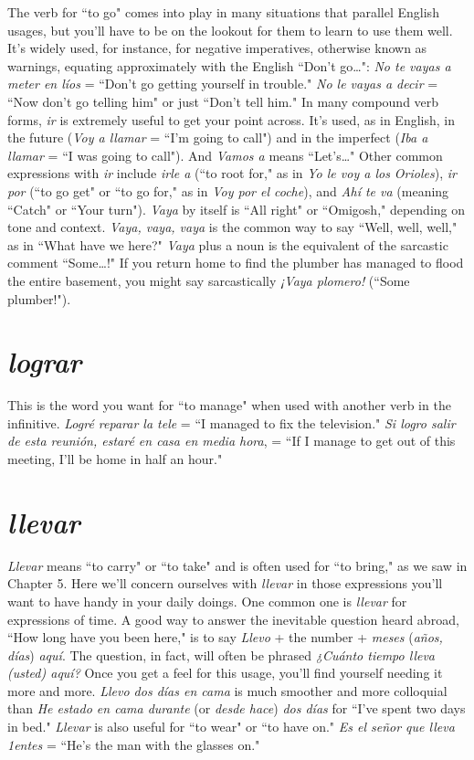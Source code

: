 The verb for ``to go" comes into play in many situations that
parallel English usages, but you'll have to be on the lookout for them
to learn to use them well. It's widely used, for instance, for negative
imperatives, otherwise known as warnings, equating approximately
with the English ``Don't go\ldots{}": \emph{No te vayas a meter en líos} =
``Don't go getting yourself in trouble." \emph{No le vayas a decir} = ``Now
don't go telling him" or just ``Don't tell him." In many compound verb
forms, \emph{ir} is extremely useful to get your point across. It's used, as in
English, in the future (\emph{Voy a llamar} = ``I'm going to call") and in the
imperfect (\emph{Iba a llamar} = ``I was going to call"). \emph{}And \emph{Vamos a} means
``Let's\ldots{}" Other common expressions with \emph{ir} include \emph{irle a} (``to root
for," as in \emph{Yo le voy a los Orioles}), \emph{ir por} (``to go get" or ``to go for," as
in \emph{Voy por el coche}), and \emph{Ahí te va} (meaning ``Catch" or ``Your turn").
\emph{Vaya} by itself is ``All right" or ``Omigosh," depending on tone and context. \emph{Vaya, vaya, vaya} is the common way to say ``Well, well, well," as
in ``What have we here?" \emph{Vaya} plus a noun is the equivalent of the
sarcastic comment ``Some\ldots{}!" If you return home to find the plumber
has managed to flood the entire basement, you might say sarcastically
\emph{¡Vaya plomero!} (``Some plumber!").

\section{\emph{lograr}}

This is the word you want for ``to manage" when used with
another verb in the infinitive. \emph{Logré reparar la tele} = ``I managed to
fix the television." \emph{Si logro salir de esta reunión, estaré en casa en
media hora}, = ``If I manage to get out of this meeting, I'll be home in
half an hour."

\section{\emph{llevar}}

\emph{Llevar} means ``to carry" or ``to take" and is often used for
``to bring," as we saw in Chapter 5. Here we'll concern ourselves with
\emph{llevar} in those expressions you'll want to have handy in your daily
doings. One common one is \emph{llevar} for expressions of time. A good way
to answer the inevitable question heard abroad, ``How long have you
been here," is to say \emph{Llevo} + the number + \emph{meses} (\emph{años, días}) \emph{aquí}.
The question, in fact, will often be phrased \emph{¿Cuánto tiempo lleva
(usted) aquí?} Once you get a feel for this usage, you'll find yourself
needing it more and more. \emph{Llevo dos días en cama} is much smoother
and more colloquial than \emph{He estado en cama durante} (or \emph{desde hace})
\emph{dos días} for ``I've spent two days in bed." \emph{Llevar} is also useful for ``to
wear" or ``to have on." \emph{Es el señor que lleva 1entes} = ``He's the man
with the glasses on."


